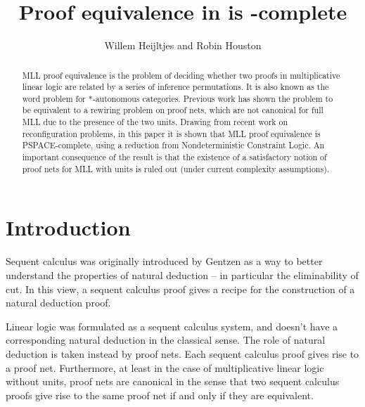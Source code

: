 \documentclass{lmcs}
\title{Proof equivalence in \capsabbrev{mll} is \capsabbrev{pspace}-complete}
\author{Willem Heijltjes and Robin Houston}
\let\capsabbrev=\uppercase
\begin{document}



\begin{abstract}
\capsabbrev{mll} proof equivalence is the problem of deciding whether two proofs in multiplicative linear logic are related by a series of inference permutations.
%
It is also known as the word problem for $*$-autonomous categories.
%
Previous work has shown the problem to be equivalent to a rewiring problem on proof nets, which are not canonical for full \capsabbrev{mll} due to the presence of the two units.
%
Drawing from recent work on reconfiguration problems, in this paper it is shown that \capsabbrev{mll} proof equivalence is \capsabbrev{pspace}-complete, using a reduction from Nondeterministic Constraint Logic.
%
An important consequence of the result is that the existence of a satisfactory notion of proof nets for \capsabbrev{mll} with units is ruled out (under current complexity assumptions).
\end{abstract}


\maketitle



\section{Introduction}
\noindent
Sequent calculus was originally introduced by Gentzen as a way to better understand
the properties of natural deduction -- in particular the eliminability of cut. In this
view, a sequent calculus proof gives a recipe for the construction of a natural deduction
proof.

Linear logic was formulated as a sequent calculus system, and doesn’t have a corresponding
natural deduction in the classical sense. The role of natural deduction is taken instead by
proof nets. Each sequent calculus proof gives rise to a proof net. Furthermore, at least in
the case of multiplicative linear logic without units, proof nets are canonical in the sense
that two sequent calculus proofs give rise to the same proof net if and only if they are
equivalent.
\end{document}
